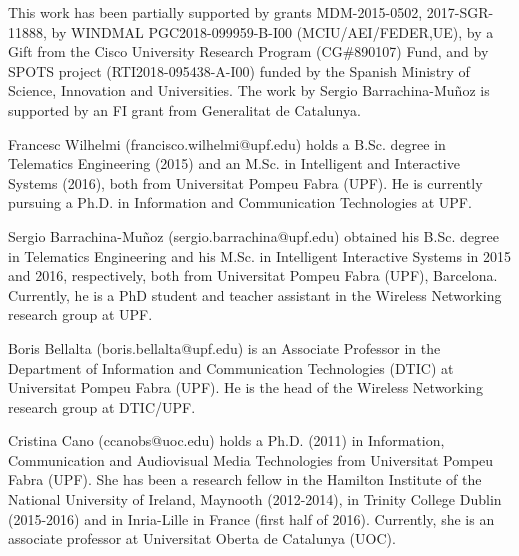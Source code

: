 \documentclass[journal]{IEEEtran}
\begin{document}
This work has been partially supported by grants MDM-2015-0502, 2017-SGR-11888, by WINDMAL PGC2018-099959-B-I00 (MCIU/AEI/FEDER,UE), by a Gift from the Cisco University Research Program (CG\#890107) Fund, and by SPOTS project (RTI2018-095438-A-I00) funded by the Spanish Ministry of Science, Innovation and Universities. The work by Sergio Barrachina-Mu\~noz is supported by an FI grant from Generalitat de Catalunya.

\ifCLASSOPTIONcaptionsoff
  \newpage
\fi




\begin{IEEEbiographynophoto}{Francesc Wilhelmi}
(francisco.wilhelmi@upf.edu) holds a B.Sc. degree in Telematics Engineering (2015) and an M.Sc. in Intelligent and Interactive Systems (2016), both from Universitat Pompeu Fabra (UPF). He is currently pursuing a Ph.D. in Information and Communication Technologies at UPF.
\end{IEEEbiographynophoto}

\begin{IEEEbiographynophoto}{Sergio Barrachina-Mu\~noz}
(sergio.barrachina@upf.edu) obtained his B.Sc. degree in Telematics Engineering and his M.Sc. in Intelligent Interactive Systems in 2015 and 2016, respectively, both from Universitat Pompeu Fabra (UPF), Barcelona. Currently, he is a PhD student and teacher assistant in the Wireless Networking research group at UPF.
\end{IEEEbiographynophoto}

\begin{IEEEbiographynophoto}{Boris Bellalta}
(boris.bellalta@upf.edu) is an Associate Professor in the Department of Information and Communication Technologies (DTIC) at Universitat Pompeu Fabra (UPF). He is the head of the Wireless Networking research group at DTIC/UPF.
\end{IEEEbiographynophoto}

\begin{IEEEbiographynophoto}{Cristina Cano}
(ccanobs@uoc.edu) holds a Ph.D. (2011) in Information, Communication and Audiovisual Media Technologies from Universitat Pompeu Fabra (UPF). She has been a research fellow in the Hamilton Institute of the National University of Ireland, Maynooth (2012-2014), in Trinity College Dublin (2015-2016) and in Inria-Lille in France (first half of 2016). Currently, she is an associate professor at Universitat Oberta de Catalunya (UOC). 
\end{IEEEbiographynophoto}
\end{document}
